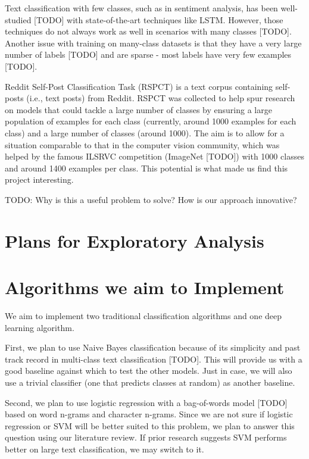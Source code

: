 \documentclass{sig-alternate-05-2015}
\begin{document}
Text classification with few classes, such as in sentiment analysis, has been well-studied [TODO] with state-of-the-art techniques like LSTM. However, those techniques do not always work as well in scenarios with many classes [TODO]. Another issue with training on many-class datasets is that they have a very large number of labels [TODO] and are sparse - most labels have very few examples [TODO].

Reddit Self-Post Classification Task (RSPCT) is a text corpus containing self-posts (i.e., text posts) from Reddit. RSPCT was collected to help spur research on models that could tackle a large number of classes by ensuring a large population of examples for each class (currently, around 1000 examples for each class) and a large number of classes (around 1000). The aim is to allow for a situation comparable to that in the computer vision community, which was helped by the famous ILSRVC competition (ImageNet [TODO]) with 1000 classes and around 1400 examples per class. This potential is what made us find this project interesting.

TODO: Why is this a useful problem to solve? How is our approach innovative?

\section{Plans for Exploratory Analysis}

\section{Algorithms we aim to Implement}

We aim to implement two traditional classification algorithms and one deep learning algorithm.

First, we plan to use Naive Bayes classification because of its simplicity and past track record in multi-class text classification [TODO]. This will provide us with a good baseline against which to test the other models. Just in case, we will also use a trivial classifier (one that predicts classes at random) as another baseline.

Second, we plan to use logistic regression with a bag-of-words model [TODO] based on word n-grams and character n-grams. Since we are not sure if logistic regression or SVM will be better suited to this problem, we plan to answer this question using our literature review. If prior research suggests SVM performs better on large text classification, we may switch to it.
\end{document}

